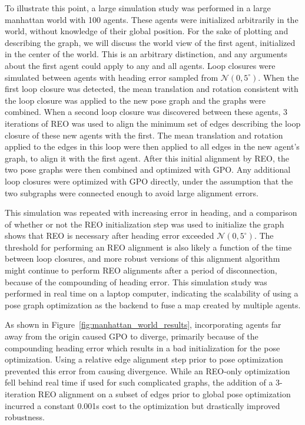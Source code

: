 To illustrate this point, a large simulation study was performed in a large manhattan world with 100 agents.  These agents were initialized arbitrarily in the world, without knowledge of their global position.  For the sake of plotting and describing the graph, we will discuss the world view of the first agent, initialized in the center of the world.  This is an arbitrary distinction, and any arguments about the first agent could apply to any and all agents. Loop closures were simulated between agents with heading error sampled from $\mathcal{N}(0, 5^\circ)$.  When the first loop closure was detected, the mean translation and rotation consistent with the loop closure was applied to the new pose graph and the graphs were combined.  When a second loop closure was discovered between these agents, 3 iterations of REO was used to align the minimum set of edges describing the loop closure of these new agents with the first.  The mean translation and rotation applied to the edges in this loop were then applied to all edges in the new agent's graph, to align it with the first agent.  After this initial alignment by REO, the two pose graphs were then combined and optimized with GPO.  Any additional loop closures were optimized with GPO directly, under the assumption that the two subgraphs were connected enough to avoid large alignment errors.

This simulation was repeated with increasing error in heading, and a comparison of whether or not the REO initialization step was used to initialize the graph shows that REO is necessary after heading error exceeded $\mathcal{N}(0,5^\circ)$.  The threshold for performing an REO alignment is also likely a function of the time between loop closures, and more robust versions of this alignment algorithm might continue to perform REO alignments after a period of disconnection, because of the compounding of heading error.  This simulation study was performed in real time on a laptop computer, indicating the scalability of using a pose graph optimization as the backend to fuse a map created by multiple agents.

As shown in Figure~\ref{fig:manhattan_world_results}, incorporating agents far away from the origin caused GPO to diverge, primarily because of the compounding heading error which results in a bad initialization for the pose optimization.  Using a relative edge alignment step prior to pose optimization prevented this error from causing divergence.  While an REO-only optimization fell behind real time if used for such complicated graphs, the addition of a 3-iteration REO alignment on a subset of edges prior to global pose optimization incurred a constant 0.001s cost to the optimization but drastically improved robustness.

